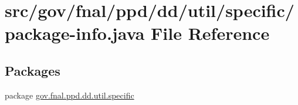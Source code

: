 \hypertarget{gov_2fnal_2ppd_2dd_2util_2specific_2package-info_8java}{\section{src/gov/fnal/ppd/dd/util/specific/package-\/info.java File Reference}
\label{gov_2fnal_2ppd_2dd_2util_2specific_2package-info_8java}
}
\subsection*{Packages}
\begin{DoxyCompactItemize}
\item 
package \hyperlink{namespacegov_1_1fnal_1_1ppd_1_1dd_1_1util_1_1specific}{gov.\-fnal.\-ppd.\-dd.\-util.\-specific}
\end{DoxyCompactItemize}
